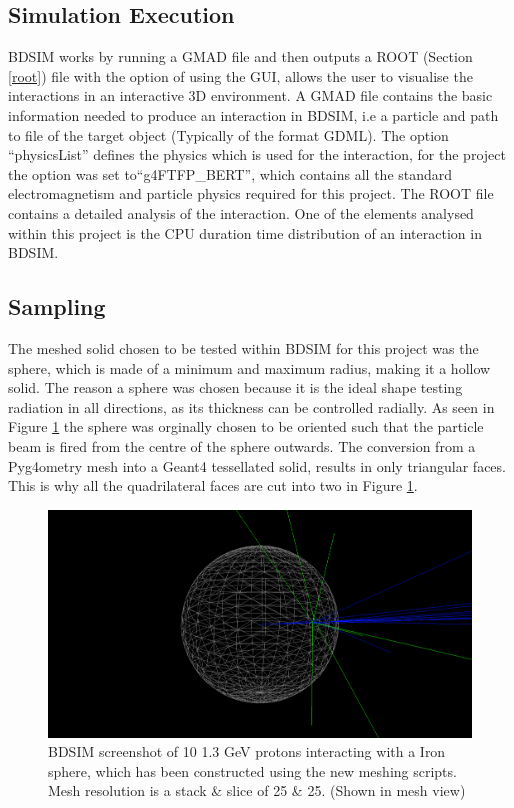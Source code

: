 \documentclass[12pt,a4paper]{article}
\begin{document}
\subsection{Simulation Execution}
BDSIM works by running a GMAD file and then outputs  a ROOT (Section \ref{root}) file with the option of using the GUI, allows the user to visualise the interactions in an interactive 3D environment. A GMAD file contains the basic information needed to produce an interaction in BDSIM, i.e a particle and path to file of the target object (Typically of the format GDML). The option ``physicsList'' defines the physics which is used for the interaction, for the project the option was set to``g4FTFP\_BERT'', which contains all the standard electromagnetism and particle physics required for this project. The ROOT file contains a detailed analysis of the interaction. One of the elements analysed within this project is the CPU duration time distribution of an interaction in BDSIM.

\newpage
\subsection{Sampling}
The meshed solid chosen to be tested within BDSIM for this project was the sphere, which is made of a minimum and maximum radius, making it a hollow solid. The reason a sphere was chosen because it is the ideal shape testing radiation in all directions, as its thickness can be controlled radially. As seen in Figure \ref{sphbd} the sphere was orginally chosen to be oriented such that the particle beam is fired from the centre of the sphere outwards. The conversion from a Pyg4ometry mesh into a Geant4 tessellated solid, results in only triangular faces. This is why all the quadrilateral faces are cut into two in Figure \ref{sphbd}.

\begin{figure}[h!]
\centering
\includegraphics[scale=0.35]{Images//BDSIM//ProtonSphere2.png}
\caption[width=\columnwidth]{BDSIM screenshot of 10 1.3 GeV protons interacting with a Iron sphere, which has been constructed using the new meshing scripts. Mesh resolution is a stack \& slice of 25 \& 25. (Shown in mesh view)}
\label{sphbd}
\end{figure}
\end{document}
